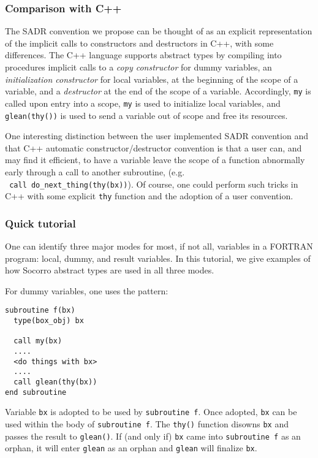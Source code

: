 \subsubsection{Comparison with C++}

The SADR convention we propose can be thought of as an explicit
representation of the implicit calls to constructors and destructors
in C++, with some differences.  The C++ language supports abstract types
by compiling into procedures implicit calls to a {\em copy constructor}
for dummy variables, an {\em initialization constructor} for local
variables, at the beginning of the scope of a variable, and a 
{\em destructor} at the end of the scope of a variable.  Accordingly,
\verb+my+ is called upon entry into a scope, \verb+my+ is used
to initialize local variables, and \verb+glean(thy())+ is used to
send a variable out of scope and free its resources.

One interesting distinction between the user implemented SADR
convention and that C++ automatic constructor/destructor convention is
that a user can, and may find it efficient, to have a variable
leave the scope of a function abnormally early through a call to
another subroutine, (e.g. \\ \verb+ call do_next_thing(thy(bx))+).  Of
course, one could perform such tricks in C++ with some explicit
\verb+thy+ function and the adoption of a user convention.

\subsubsection{Quick tutorial}

One can identify three major modes for most, if not all, variables
in a FORTRAN program: local, dummy, and result variables.  In this
tutorial, we give examples of how Socorro abstract types are used in
all three modes.

For dummy variables, one uses the pattern:
\begin{verbatim}
subroutine f(bx)
  type(box_obj) bx

  call my(bx)
  ....
  <do things with bx>
  ....
  call glean(thy(bx))
end subroutine
\end{verbatim}
Variable \verb+bx+ is adopted to be used by \verb+subroutine f+.  Once
adopted, \verb+bx+ can be used within the body of \verb+subroutine f+.
The \verb+thy()+ function disowns \verb+bx+ and passes the result to
\verb+glean()+.  If (and only if) \verb+bx+ came into \verb+subroutine f+ as an orphan, it will enter \verb+glean+ as an orphan and
\verb+glean+ will finalize \verb+bx+.


